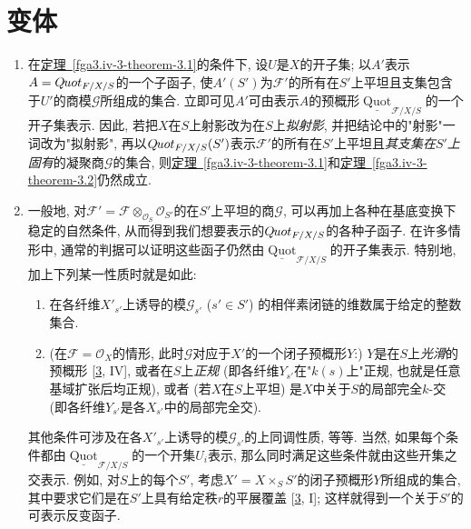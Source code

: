 \chapter{变体}\thispagestyle{fancy}\label{fga3.iv-4}
\begin{enumerate}

  
 \item[a.]
    
\par{}\label{fga3.iv-4.a} 在\hyperref[fga3.iv-3-theorem-3.1]{定理~\ref*{fga3.iv-3-theorem-3.1}}的条件下, 设\(U\)是\(X\)的开子集; 以\(A'\)表示\(A=\mathscr {Q}\kern  -.75pt\mathit {uot}_{{\mathscr {F}/X/S}}\)的一个子函子, 使\(A'(S')\)为\(\mathscr {F}'\)的所有在\(S'\)上平坦且支集包含于\(U'\)的商模\(\mathscr {G}\)所组成的集合. 立即可见\(A'\)可由表示\(A\)的预概形\(\underline {\operatorname {Quot}}_{{\mathscr {F}/X/S}}\)的一个开子集表示. 因此, 若把\(X\)在\(S\)上射影改为在\(S\)上\emph{拟射影}, 并把结论中的"射影"一词改为"拟射影", 再以\(\mathscr {Q}\kern  -.75pt\mathit {uot}_{{\mathscr {F}/X/S}}(S')\)表示\(\mathscr {F}'\)的所有在\(S'\)上平坦且\emph{其支集在\(S'\)上固有}的凝聚商\(\mathscr {G}\)的集合, 则\hyperref[fga3.iv-3-theorem-3.1]{定理~\ref*{fga3.iv-3-theorem-3.1}}和\hyperref[fga3.iv-3-theorem-3.2]{定理~\ref*{fga3.iv-3-theorem-3.2}}仍然成立.
  

  
 \item[b.]
    
\par{}\label{fga3.iv-4.b} 一般地, 对\(\mathscr {F}'=\mathscr {F}\otimes _{\mathcal {O}_S}\mathcal {O}_{S'}\)的在\(S'\)上平坦的商\(\mathscr {G}\), 可以再加上各种在基底变换下稳定的自然条件, 从而得到我们想要表示的\(\mathscr {Q}\kern  -.75pt\mathit {uot}_{{\mathscr {F}/X/S}}\)的各种子函子. 在许多情形中, 通常的判据可以证明这些函子仍然由\(\underline {\operatorname {Quot}}_{{\mathscr {F}/X/S}}\)的开子集表示. 特别地, 加上下列某一性质时就是如此: 
\begin{enumerate}\item{}在各纤维\(X'_{s'}\)上诱导的模\(\mathscr {G}_{s'}\) (\(s'\in  S'\)) 的相伴素闭链的维数属于给定的整数集合.
        \item{}(在\(\mathscr {F}=\mathcal {O}_X\)的情形, 此时\(\mathscr {G}\)对应于\(X'\)的一个闭子预概形\(Y\):) \(Y\)是在\(S\)上\emph{光滑}的预概形 [\hyperref[Gro1960b]{3}, IV], 或者在\(S\)上\emph{正规} (即各纤维\(Y_{s'}\)在"\(k(s)\)上"正规, 也就是任意基域扩张后均正规), 或者 (若\(X\)在\(S\)上平坦) 是\(X\)中关于\(S\)的局部完全\(k\)-交 (即各纤维\(Y_{s'}\)是各\(X_{s'}\)中的局部完全交).
\end{enumerate} 其他条件可涉及在各\(X'_{s'}\)上诱导的模\(\mathscr {G}_{s'}\)的上同调性质, 等等. 当然, 如果每个条件都由\(\underline {\operatorname {Quot}}_{{\mathscr {F}/X/S}}\)的一个开集\(U_i\)表示, 那么同时满足这些条件就由这些开集之交表示. 例如, 对\(S\)上的每个\(S'\), 考虑\(X'=X\times _S S'\)的闭子预概形\(Y\)所组成的集合, 其中要求它们是在\(S'\)上具有给定秩\(r\)的平展覆盖 [\hyperref[Gro1960b]{3}, I]; 这样就得到一个关于\(S'\)的可表示反变函子.
  


\end{enumerate}
